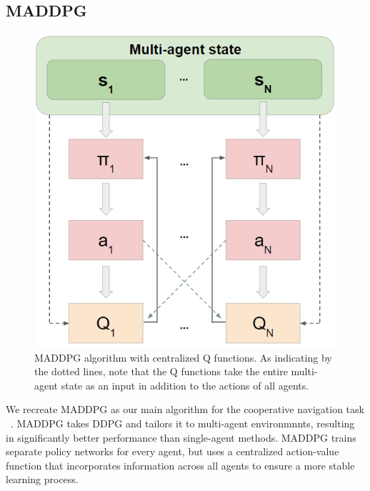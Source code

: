 \documentclass{article}
\begin{document}
\subsection{MADDPG}

\begin{figure}
\begin{center}
\includegraphics[scale=0.5]{maddpg-diagram}
\end{center}
\caption{MADDPG algorithm with centralized Q functions. As indicating by the dotted lines, note that the Q functions take the entire multi-agent state as an input in addition to the actions of all agents.}
\label{fig:diagram}
\end{figure}

We recreate MADDPG as our main algorithm for the cooperative navigation task ~\cite{maddpg}.  MADDPG takes DDPG and tailors it to multi-agent environmnnts, resulting in significantly better performance than single-agent methods. MADDPG trains separate policy networks for every agent, but uses a centralized action-value function that incorporates information across all agents to ensure a more stable learning process. 
\end{document}
